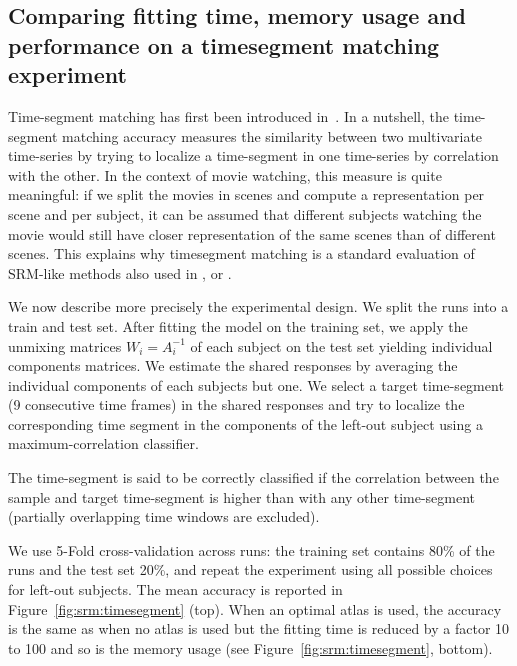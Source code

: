 \documentclass{article}
\begin{document}
\subsection{Comparing fitting time, memory usage and performance on a
  timesegment matching experiment}
\label{sec:timesegment_expe}
\label{timesegment_expe}
Time-segment matching has first been introduced
in~\cite{chen2015reduced}.
%
In a nutshell, the time-segment matching accuracy measures the similarity
between two multivariate time-series by trying to localize a time-segment in one
time-series by correlation with the other.
%
In the context of movie watching, this measure is quite meaningful: if
we split the movies in scenes and compute a representation per scene
and per subject, it can be assumed that different subjects watching
the movie would still have closer representation of the same scenes
than of different scenes.
%
This explains why timesegment matching is a standard evaluation of SRM-like methods also used in  \cite{guntupalli2018computational}, \cite{Nastase741975} or
\cite{zhang2016searchlight}.
%


We now describe more precisely the experimental design.
%
We split the runs into a train and test set.
%
After fitting the model on the
training set, we apply the unmixing matrices $W_i=A_i^{-1}$ of each subject on
the test set yielding individual components matrices.
%
We estimate the shared responses by averaging the individual components of each
subjects but one.
%
We select a target time-segment (9 consecutive time frames) in the shared
responses and try to localize the corresponding time segment in the components
of the left-out subject using a maximum-correlation classifier.
%

The time-segment is said to be
correctly classified if the correlation between the sample and target
time-segment is higher than with any other time-segment (partially overlapping
time windows are excluded).
%

% 
We use 5-Fold cross-validation across runs: the training set contains 80\% of
the runs and the test set 20\%, and repeat the experiment using all possible
choices for left-out subjects.
%
% 
The mean accuracy is reported in Figure~\ref{fig:srm:timesegment} (top).
%
When an optimal atlas is used, the accuracy is the same as when no
atlas is used but the fitting time is reduced by a factor 10 to 100
and so is the memory usage (see Figure~\ref{fig:srm:timesegment},
bottom).
%

% 
\end{document}
